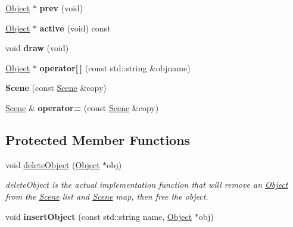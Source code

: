 \begin{DoxyCompactItemize}
\item 
\hypertarget{class_scene_ac852d5d763eb35b4908c9aa7ea54d1ae}{\hyperlink{class_object}{Object} $\ast$ {\bfseries prev} (void)}\label{class_scene_ac852d5d763eb35b4908c9aa7ea54d1ae}

\item 
\hypertarget{class_scene_ad0ea1a6bcf7815c63988bd937f06eb23}{\hyperlink{class_object}{Object} $\ast$ {\bfseries active} (void) const }\label{class_scene_ad0ea1a6bcf7815c63988bd937f06eb23}

\item 
\hypertarget{class_scene_a41fbbe388ea322df338648e66611ffcf}{void {\bfseries draw} (void)}\label{class_scene_a41fbbe388ea322df338648e66611ffcf}

\item 
\hypertarget{class_scene_ae9b69d8db8a46991017635f22e45baad}{\hyperlink{class_object}{Object} $\ast$ {\bfseries operator\mbox{[}$\,$\mbox{]}} (const std\-::string \&objname)}\label{class_scene_ae9b69d8db8a46991017635f22e45baad}

\item 
\hypertarget{class_scene_aa6e6354478dc7df82446b3abf9f91d96}{{\bfseries Scene} (const \hyperlink{class_scene}{Scene} \&copy)}\label{class_scene_aa6e6354478dc7df82446b3abf9f91d96}

\item 
\hypertarget{class_scene_a6336263b33b06ce4ace53599ffd8122c}{\hyperlink{class_scene}{Scene} \& {\bfseries operator=} (const \hyperlink{class_scene}{Scene} \&copy)}\label{class_scene_a6336263b33b06ce4ace53599ffd8122c}

\end{DoxyCompactItemize}
\subsection*{Protected Member Functions}
\begin{DoxyCompactItemize}
\item 
void \hyperlink{class_scene_ad3897f8ac658af62c133783b2c4eaee4}{delete\-Object} (\hyperlink{class_object}{Object} $\ast$obj)
\begin{DoxyCompactList}\small\item\em delete\-Object is the actual implementation function that will remove an \hyperlink{class_object}{Object} from the \hyperlink{class_scene}{Scene} list and \hyperlink{class_scene}{Scene} map, then free the object. \end{DoxyCompactList}\item 
\hypertarget{class_scene_ab64354bd8059bab589ca2dbf9de9e66c}{void {\bfseries insert\-Object} (const std\-::string name, \hyperlink{class_object}{Object} $\ast$obj)}\label{class_scene_ab64354bd8059bab589ca2dbf9de9e66c}

\end{DoxyCompactItemize}
